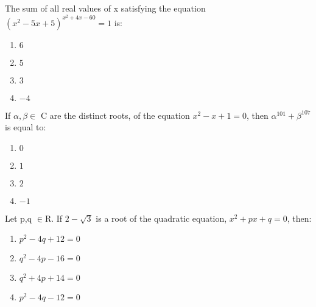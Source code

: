 \documentclass[journal,12pt,twocolumn]{IEEEtran}
\begin{document}

\item The sum of all real values of x satisfying the equation $(x^2-5x+5)^{x^2+4x-60}=1$ is:
\begin{enumerate}
\item $6$
\item $5$
\item $3$
\item $-4$ 
\end{enumerate}

\item If $\alpha,\beta\in$ C are the distinct roots, of the equation $x^2-x+1=0$, then $\alpha^{101}+\beta^{107}$ is equal to:
\begin{enumerate}
\item $0$
\item $1$
\item $2$
\item $-1$ 
\end{enumerate}

\item Let p,q $\in$R. If $2-\sqrt{3}$ is a root of the quadratic equation, $x^2+px+q=0$, then:
\begin{enumerate}
\item $p^2-4q+12 = 0$
\item $q^2-4p-16 = 0$
\item $q^2+4p+14 = 0$
\item $p^2-4q-12 = 0$
\end{enumerate}
\end{document}

